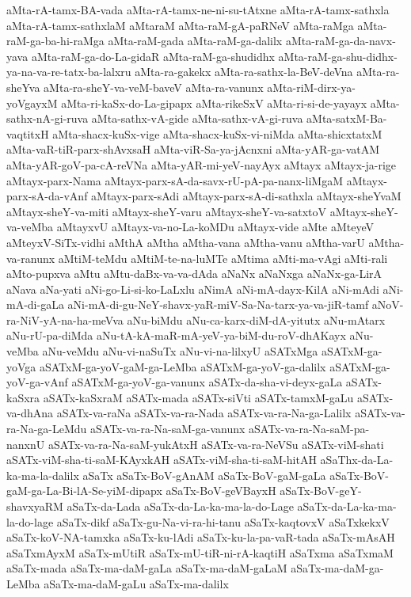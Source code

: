 {aMta-rA-tamx-BA-vada
aMta-rA-tamx-ne-ni-su-tAtxne
aMta-rA-tamx-sathxla
aMta-rA-tamx-sathxlaM
aMtaraM
aMta-raM-gA-paRNeV
aMta-raMga
aMta-raM-ga-ba-hi-raMga
aMta-raM-gada
aMta-raM-ga-dalilx
aMta-raM-ga-da-navx-yava
aMta-raM-ga-do-La-gidaR
aMta-raM-ga-shudidhx
aMta-raM-ga-shu-didhx-ya-na-va-re-tatx-ba-lalxru
aMta-ra-gakekx
aMta-ra-sathx-la-BeV-deVna
aMta-ra-sheYva
aMta-ra-sheY-va-veM-baveV
aMta-ra-vanunx
aMta-riM-dirx-ya-yoVgayxM
aMta-ri-kaSx-do-La-gipapx
aMta-rikeSxV
aMta-ri-si-de-yayayx
aMta-sathx-nA-gi-ruva
aMta-sathx-vA-gide
aMta-sathx-vA-gi-ruva
aMta-satxM-Ba-vaqtitxH
aMta-shacx-kuSx-vige
aMta-shacx-kuSx-vi-niMda
aMta-shicxtatxM
aMta-vaR-tiR-parx-shAvxsaH
aMta-viR-Sa-ya-jAcnxni
aMta-yAR-ga-vatAM
aMta-yAR-goV-pa-cA-reVNa
aMta-yAR-mi-yeV-nayAyx
aMtayx
aMtayx-ja-rige
aMtayx-parx-Nama
aMtayx-parx-sA-da-savx-rU-pA-pa-nanx-liMgaM
aMtayx-parx-sA-da-vAnf
aMtayx-parx-sAdi
aMtayx-parx-sA-di-sathxla
aMtayx-sheYvaM
aMtayx-sheY-va-miti
aMtayx-sheY-varu
aMtayx-sheY-va-satxtoV
aMtayx-sheY-va-veMba
aMtayxvU
aMtayx-va-no-La-koMDu
aMtayx-vide
aMte
aMteyeV
aMteyxV-SiTx-vidhi
aMthA
aMtha
aMtha-vana
aMtha-vanu
aMtha-varU
aMtha-va-ranunx
aMtiM-teMdu
aMtiM-te-na-luMTe
aMtima
aMti-ma-vAgi
aMti-rali
aMto-pupxva
aMtu
aMtu-daBx-va-va-dAda
aNaNx
aNaNxga
aNaNx-ga-LirA
aNava
aNa-yati
aNi-go-Li-si-ko-LaLxlu
aNimA
aNi-mA-dayx-KilA
aNi-mAdi
aNi-mA-di-gaLa
aNi-mA-di-gu-NeY-shavx-yaR-miV-Sa-Na-tarx-ya-va-jiR-tamf
aNoV-ra-NiV-yA-na-ha-meVva
aNu-biMdu
aNu-ca-karx-diM-dA-yitutx
aNu-mAtarx
aNu-rU-pa-diMda
aNu-tA-kA-maR-mA-yeV-ya-biM-du-roV-dhAKayx
aNu-veMba
aNu-veMdu
aNu-vi-naSuTx
aNu-vi-na-lilxyU
aSATxMga
aSATxM-ga-yoVga
aSATxM-ga-yoV-gaM-ga-LeMba
aSATxM-ga-yoV-ga-dalilx
aSATxM-ga-yoV-ga-vAnf
aSATxM-ga-yoV-ga-vanunx
aSATx-da-sha-vi-deyx-gaLa
aSATx-kaSxra
aSATx-kaSxraM
aSATx-mada
aSATx-siVti
aSATx-tamxM-gaLu
aSATx-va-dhAna
aSATx-va-raNa
aSATx-va-ra-Nada
aSATx-va-ra-Na-ga-Lalilx
aSATx-va-ra-Na-ga-LeMdu
aSATx-va-ra-Na-saM-ga-vanunx
aSATx-va-ra-Na-saM-pa-nanxnU
aSATx-va-ra-Na-saM-yukAtxH
aSATx-va-ra-NeVSu
aSATx-viM-shati
aSATx-viM-sha-ti-saM-KAyxkAH
aSATx-viM-sha-ti-saM-hitAH
aSaThx-da-La-ka-ma-la-dalilx
aSaTx
aSaTx-BoV-gAnAM
aSaTx-BoV-gaM-gaLa
aSaTx-BoV-gaM-ga-La-Bi-lA-Se-yiM-dipapx
aSaTx-BoV-geVBayxH
aSaTx-BoV-geY-shavxyaRM
aSaTx-da-Lada
aSaTx-da-La-ka-ma-la-do-Lage
aSaTx-da-La-ka-ma-la-do-lage
aSaTx-dikf
aSaTx-gu-Na-vi-ra-hi-tanu
aSaTx-kaqtovxV
aSaTxkekxV
aSaTx-koV-NA-tamxka
aSaTx-ku-lAdi
aSaTx-ku-la-pa-vaR-tada
aSaTx-mAsAH
aSaTxmAyxM
aSaTx-mUtiR
aSaTx-mU-tiR-ni-rA-kaqtiH
aSaTxma
aSaTxmaM
aSaTx-mada
aSaTx-ma-daM-gaLa
aSaTx-ma-daM-gaLaM
aSaTx-ma-daM-ga-LeMba
aSaTx-ma-daM-gaLu
aSaTx-ma-dalilx
}
